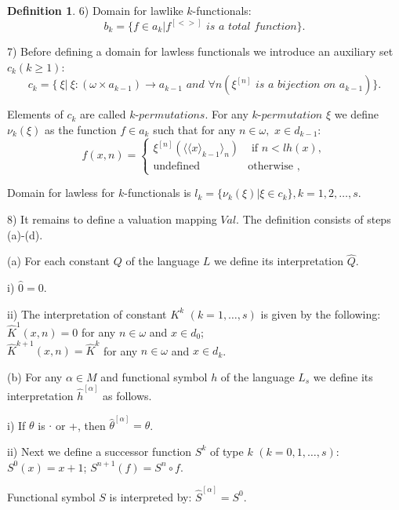 \documentclass{asl}
\theoremstyle{definition}
\newtheorem{definition}{Definition}[section]
\begin{document}
\begin{definition}
6) Domain for lawlike $k$-functionals: 
\[ b_{k}=\{f \in a_{k} | f^{[<>]} \textit{  is a total function} \} . \]

7) Before defining a domain for lawless functionals we introduce an auxiliary set $c_{k} (k\geqslant 1)$: 
\[c_{k}= \{\ \xi |\ \xi :(\omega \times a_{k-1}) \rightarrow a_{k-1} 
\textit{  and  }\forall n (\xi^{[n]} \textit{ is a bijection on } a_{k-1}) \}.\]

Elements of $ c_{k} $ are called $k\textit{-permutations}$. For any $k\textit{-permutation }  \xi$ we define $\nu_k(\xi)$ as the function  $f \in a_{k}$ such that for any $ n\in\omega, $ $x \in d_{k-1} $:  
\begin{displaymath}
f(x,n) =
\begin{cases}
\xi^{[n]}(\langle \langle x\rangle_{k-1}\rangle_n)  & \text{ if } n<lh(x),\\
\text{undefined}& \text{otherwise },
\end{cases}
\end{displaymath} 

Domain for lawless for $k$-functionals is $l_{k}=\{\nu_k(\xi)| \xi\in c_{k} \}, k=1,2,\ldots,s$.
\medskip 

8) It remains to define a valuation mapping $Val$. The definition consists of steps (a)-(d).

(a) For each constant $ Q $ of the language $ L $ we define its interpretation $ \widehat{Q} $.

i) $ \widehat{0}=0 $.

ii) The interpretation of constant $ K^k$  $(k=1,\ldots,s) $ is given by the following:
\smallskip
\\$\widehat{K}^{1} (x,n)=0$ for any $ n\in \omega$ and $ x\in d_0 $;
\medskip\\
$\widehat{K}^{k+1}(x,n)=\widehat{K}^{k}$ for any $ n\in \omega$ and $ x\in d_k $.
\medskip

(b) For any $ \alpha\in M $ and functional symbol $ h $ of the language $ L_{s} $ we define its interpretation $ \widehat{h}^{[\alpha]}$ as follows.
\medskip

i) If $\theta$ is $\cdot$ or +, then $\widehat{\theta}^{[\alpha]}=\theta$.
\medskip

ii) Next we define a successor function $S^{k} $ of type $ k$  $(k=0, 1,\ldots, s) $:\\
$S^{0}(x)=x+1$;   $S^{n+1}(f)=S^{n} \circ f.$
\medskip

Functional symbol $S$ is interpreted by: $ \widehat{S}^{[\alpha]} = S^{0}$.
\medskip


\end{definition}
\end{document}
